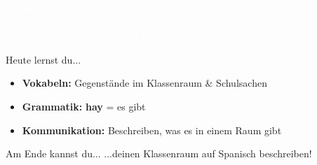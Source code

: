 \documentclass[aspectratio=169, 11pt]{beamer}
\newcommand{\es}[1]{\textbf{\textcolor{spanischrot}{#1}}}
\begin{document}
\begin{frame}
\begin{center}
\vspace{1cm}
{\Huge\bfseries\textcolor{white}{Objetos de clase}}\\[0.5cm]
{\Large\textcolor{white}{Was gibt es im Klassenraum?}}\\[1.5cm]
{\large\textcolor{white}{Spanisch · Klasse 7 · Unidad 2}}
\end{center}
\end{frame}

\begin{frame}{Heute lernst du...}
\begin{itemize}
    \item[\textcolor{spanischrot}{\textbullet}] \textbf{Vokabeln:} Gegenstände im Klassenraum \& Schulsachen
    \item[\textcolor{spanischrot}{\textbullet}] \textbf{Grammatik:} \es{hay} = es gibt
    \item[\textcolor{spanischrot}{\textbullet}] \textbf{Kommunikation:} Beschreiben, was es in einem Raum gibt
\end{itemize}

\vspace{1cm}

\begin{block}{Am Ende kannst du...}
...deinen Klassenraum auf Spanisch beschreiben!
\end{block}
\end{frame}
\end{document}
